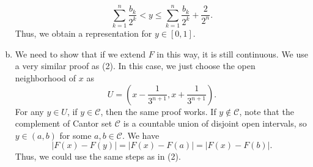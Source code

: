 \documentclass[letterpaper, 12pt]{article}
\begin{document}
\begin{solution}
\begin{enumerate}[(a)]
  \[\sum_{k=1}^{n}\frac{b_k}{2^k}<y\leq \sum_{k=1}^{n}\frac{b_k}{2^k}+\frac{2}{2^n}.\]
  Thus, we obtain a representation for \(y\in [0,1]\). 
  \item We need to show that if we extend \(F\) in this way, it is still continuous. We use a very similar proof as (2). In this case, we just choose the open neighborhood of \(x\) as 
  \[U=(x-\frac{1}{3^{n+1}},x+\frac{1}{3^{n+1}}).\]
  For any \(y\in U\), if \(y\in \mathcal{C}\), then the same proof works. If \(y\notin \mathcal{C}\), note that the complement of Cantor set \(\mathcal{C}\) is a countable union of disjoint open intervals, so \(y\in (a,b)\) for some \(a,b\in \mathcal{C}\). We have 
  \[|F(x)-F(y)|=|F(x)-F(a)|=|F(x)-F(b)|.\]
  Thus, we could use the same steps as in (2).
\end{enumerate}
\end{solution}
\end{document}
